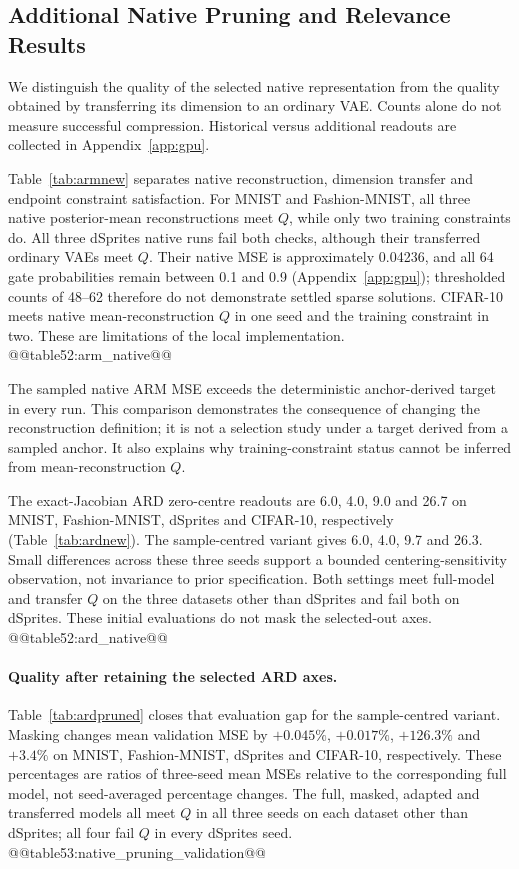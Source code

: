\subsection{Additional Native Pruning and Relevance Results}\label{sec:newpruning}
We distinguish the quality of the selected native representation from
the quality obtained by transferring its dimension to an ordinary VAE.
Counts alone do not measure successful compression. Historical versus
additional readouts are collected in Appendix~\ref{app:gpu}.

Table~\ref{tab:armnew} separates native reconstruction, dimension transfer
and endpoint constraint satisfaction. For MNIST and Fashion-MNIST,
all three native posterior-mean reconstructions meet $Q$, while only
two training constraints do. All three dSprites native runs fail both
checks, although their transferred ordinary VAEs meet $Q$. Their native
MSE is approximately 0.04236, and all 64 gate probabilities remain
between 0.1 and 0.9 (Appendix~\ref{app:gpu}); thresholded counts of 48--62
therefore do not demonstrate settled sparse solutions. CIFAR-10 meets
native mean-reconstruction $Q$ in one seed and the training constraint
in two. These are limitations of the local implementation.
@@table52:arm_native@@

The sampled native ARM MSE exceeds the deterministic anchor-derived
target in every run. This comparison demonstrates the consequence of
changing the reconstruction definition; it is not a selection study
under a target derived from a sampled anchor. It also explains why
training-constraint status cannot be inferred from mean-reconstruction $Q$.

The exact-Jacobian ARD zero-centre readouts are 6.0, 4.0, 9.0 and 26.7
on MNIST, Fashion-MNIST, dSprites and CIFAR-10, respectively
(Table~\ref{tab:ardnew}). The sample-centred variant gives 6.0, 4.0, 9.7
and 26.3. Small differences across these three seeds support a bounded
centering-sensitivity observation, not invariance to prior specification.
Both settings meet full-model and transfer $Q$ on the three datasets
other than dSprites and fail both on dSprites. These initial evaluations
do not mask the selected-out axes.
@@table52:ard_native@@

\paragraph{Quality after retaining the selected ARD axes.}
Table~\ref{tab:ardpruned} closes that evaluation gap for the
sample-centred variant. Masking changes mean validation MSE by
$+0.045\%$, $+0.017\%$, $+126.3\%$ and $+3.4\%$ on MNIST,
Fashion-MNIST, dSprites and CIFAR-10, respectively. These percentages
are ratios of three-seed mean MSEs relative to the corresponding full
model, not seed-averaged percentage changes. The full, masked, adapted
and transferred models all meet $Q$ in all three seeds on each dataset
other than dSprites; all four fail $Q$ in every dSprites seed.
@@table53:native_pruning_validation@@

